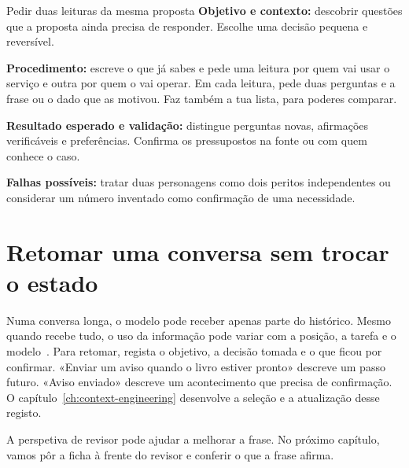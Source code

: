 \begin{promptlabbox}{Pedir duas leituras da mesma proposta}
\textbf{Objetivo e contexto:} descobrir questões que a proposta ainda precisa de responder. Escolhe uma decisão pequena e reversível.

\textbf{Procedimento:} escreve o que já sabes e pede uma leitura por quem vai usar o serviço e outra por quem o vai operar. Em cada leitura, pede duas perguntas e a frase ou o dado que as motivou. Faz também a tua lista, para poderes comparar.

\textbf{Resultado esperado e validação:} distingue perguntas novas, afirmações verificáveis e preferências. Confirma os pressupostos na fonte ou com quem conhece o caso.

\textbf{Falhas possíveis:} tratar duas personagens como dois peritos independentes ou considerar um número inventado como confirmação de uma necessidade.
\end{promptlabbox}

\section{Retomar uma conversa sem trocar o estado}

Numa conversa longa, o modelo pode receber apenas parte do histórico. Mesmo quando recebe tudo, o uso da informação pode variar com a posição, a tarefa e o modelo~\citep{liu2024}. Para retomar, regista o objetivo, a decisão tomada e o que ficou por confirmar. «Enviar um aviso quando o livro estiver pronto» descreve um passo futuro. «Aviso enviado» descreve um acontecimento que precisa de confirmação. O capítulo~\ref{ch:context-engineering} desenvolve a seleção e a atualização desse registo.

A perspetiva de revisor pode ajudar a melhorar a frase. No próximo capítulo, vamos pôr a ficha à frente do revisor e conferir o que a frase afirma.
